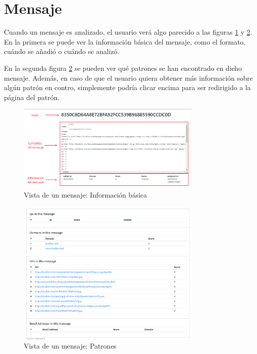 \section{Mensaje}
Cuando un mensaje es analizado, el usuario verá algo parecido a las figuras \ref{fig:mensaje_datos} y \ref{fig:mensaje_patrones}. En la primera se puede ver la información básica del mensaje, como el formato, cuándo se añadió o cuándo se analizó. 

En la segunda figura \ref{fig:mensaje_patrones} se pueden ver qué patrones se han encontrado en dicho mensaje. Además, en caso de que el usuario quiera obtener más información sobre algún patrón en contro, simplemente podría clicar encima para ser redirigido a la página del patrón. 

\begin{figure}[htb]
    \centering
    \includegraphics[width=0.8\textwidth]{imagenes/capturasAplicacion/Mensaje_info.png}
\caption{Vista de un mensaje: Información básica}
\label{fig:mensaje_datos}
\end{figure}

\begin{figure}[htb]
    \centering
    \includegraphics[width=0.8\textwidth]{imagenes/capturasAplicacion/Mensaje_patrones.png}
\caption{Vista de un mensaje: Patrones}
\label{fig:mensaje_patrones}
\end{figure}

